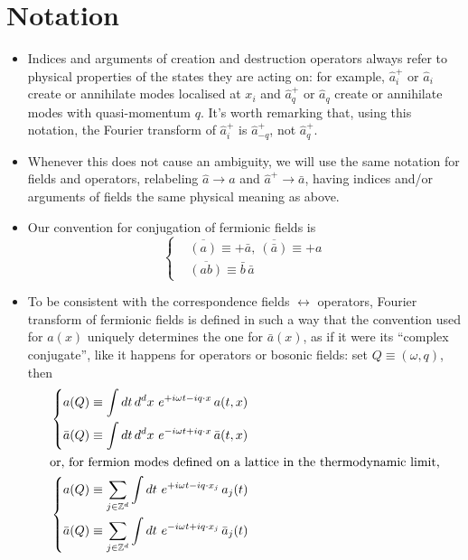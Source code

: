 \documentclass[a4paper,11pt, english]{article}
\theoremstyle{remark}
\newcommand{\obar}[1]{\overline{#1}}
\begin{document}
\section{Notation}
 \begin{itemize}
  
  \item Indices and arguments of creation and destruction operators always refer to physical properties of the states they are acting on: for example, $\hat{a}_i^+$ or $\hat{a}_i$ create or annihilate modes localised at $x_i$ and $\hat{a}_q^+$ or $\hat{a}_q$ create  or annihilate modes with quasi-momentum $q$. It's worth remarking that, using this notation, the Fourier transform of $\hat{a}_i^+$ is $\hat{a}_{-q}^+$, not $\hat{a}_q^+$.
   
  \item Whenever this does not cause an ambiguity, we will use the same notation for fields and operators, relabeling $\hat{a} \rightarrow a$ and $\hat{a}^+ \rightarrow \bar{a}$, having indices and/or arguments of fields the same physical meaning as above.
  
  \item Our convention for conjugation of fermionic fields is
    \begin{equation*} 
     \left \{ \begin{aligned}
     & \obar{(a)}\equiv +\bar{a},\ \obar{(\bar{a})}\equiv +a \\
     & \obar{(ab)} \equiv \bar{b}\,\bar{a}
	      \end{aligned}
     \right .
    \end{equation*}
   
  \item To be consistent with the correspondence fields $\leftrightarrow$ operators, Fourier transform of fermionic fields is defined in such a way that  the convention used for $a(x)$ uniquely determines the one for $\bar{a}(x)$, as if it were its ``complex conjugate'', like it happens for operators or bosonic fields: set $Q \equiv (\omega,q)$, then 
   \begin{align*}
   & \left \{ \begin{aligned}
     & a(Q) \equiv \int dt\,d^dx\ e^{+i\omega t -iq\cdot x}\, a(t,x) \\
     & \bar{a}(Q) \equiv \int dt\,d^dx\ e^{-i\omega t +iq\cdot x}\, \bar{a}(t,x)
	    \end{aligned}
     \right .\\
   \intertext{or, for fermion modes defined on a lattice in the thermodynamic limit,}
   &  \left \{ \begin{aligned}
     & a(Q) \equiv \sum_{j\in \mathbb{Z}^d} \int dt\ e^{+i\omega t -iq\cdot x_j}\, a_j(t) \\
     & \bar{a}(Q) \equiv \sum_{j\in \mathbb{Z}^d} \int dt\ e^{-i\omega t +iq\cdot x_j}\, \bar{a}_j(t)
	    \end{aligned}
     \right .
   \end{align*}
  

\end{itemize}
\end{document}
